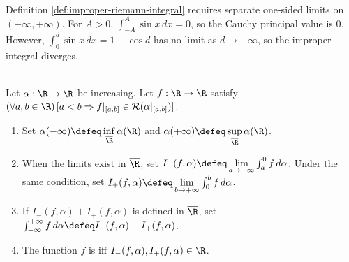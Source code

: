 \begin{perspective} \label{per:cauchy-principal-value-not-improper-integral} \\
Definition \ref{def:improper-riemann-integral} requires separate one-sided limits on $(-\infty,+\infty)$. For $A>0$, $\int_{-A}^{A}\sin x\,dx=0$, so the Cauchy principal value is $0$.\\
However, $\int_0^d\sin x\,dx=1-\cos d$ has no limit as $d\to+\infty$, so the improper integral diverges.
\end{perspective}

\begin{definition} \label{def:improper-riemann-stieltjes-real-line} \\
Let $\alpha:\R\to\R$ be increasing. Let $f:\R\to\R$ satisfy $(\forall a,b\in\R)\,[a<b\Rightarrow f|_{[a,b]}\in\mathcal{R}(\alpha|_{[a,b]})]$.
\begin{enumerate}[label=(\roman*)]
\setlength{\itemsep}{0pt}
\item Set $\alpha(-\infty)\defeq\inf\limits_{\overline{\R}}\alpha(\R)$ and $\alpha(+\infty)\defeq\sup\limits_{\overline{\R}}\alpha(\R)$.
\item When the limits exist in $\overline{\R}$, set $I_-(f,\alpha)\defeq\lim\limits_{a\to-\infty}\int_a^0 f\,d\alpha$. Under the same condition, set $I_+(f,\alpha)\defeq\lim\limits_{b\to+\infty}\int_0^b f\,d\alpha$.
\item If $I_-(f,\alpha)+I_+(f,\alpha)$ is defined in $\overline{\R}$, set $\int_{-\infty}^{+\infty}f\,d\alpha\defeq I_-(f,\alpha)+I_+(f,\alpha)$.
\item The function $f$ is  iff $I_-(f,\alpha),I_+(f,\alpha)\in\R$.
\end{enumerate}
\end{definition}

